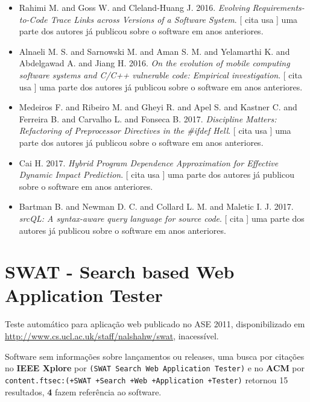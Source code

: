 \begin{itemize}
\item Rahimi M. and Goss W. and Cleland-Huang J.
      2016.
        \textit{ Evolving Requirements-to-Code Trace Links across Versions of a Software System}.
      [
          cita
          usa
      ]
uma parte dos autores já publicou sobre o software em anos anteriores.
\item Alnaeli M. S. and Sarnowski M. and Aman S. M. and Yelamarthi K. and Abdelgawad A. and Jiang H.
      2016.
        \textit{ On the evolution of mobile computing software systems and C/C++ vulnerable code: Empirical investigation}.
      [
          cita
          usa
      ]
uma parte dos autores já publicou sobre o software em anos anteriores.
\item Medeiros F. and Ribeiro M. and Gheyi R. and Apel S. and Kastner C. and Ferreira B. and Carvalho L. and Fonseca B.
      2017.
        \textit{ Discipline Matters: Refactoring of Preprocessor Directives in the \#ifdef Hell}.
      [
          cita
          usa
      ]
uma parte dos autores já publicou sobre o software em anos anteriores.
\item Cai H.
      2017.
        \textit{ Hybrid Program Dependence Approximation for Effective Dynamic Impact Prediction}.
      [
          cita
          usa
      ]
uma parte dos autores já publicou sobre o software em anos anteriores.
\item Bartman B. and Newman D. C. and Collard L. M. and Maletic I. J.
      2017.
        \textit{ srcQL: A syntax-aware query language for source code}.
      [
          cita
      ]
uma parte dos autores já publicou sobre o software em anos anteriores.
\end{itemize}
\section{SWAT - Search based Web Application Tester}

Teste automático para aplicação web
publicado no ASE 2011,
disponibilizado em \url{http://www.cs.ucl.ac.uk/staff/nalshahw/swat},
inacessível.

Software sem informações sobre lançamentos ou releases,
uma busca por citações no {\bf IEEE Xplore} por
\texttt{(SWAT Search Web Application Tester)}
e no {\bf ACM} por
\texttt{content.ftsec:(+SWAT +Search +Web +Application +Tester)}
retornou
15 resultados,
{\bf 4} fazem referência ao software.


